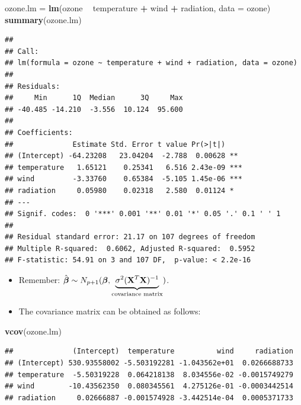 \documentclass[10pt,ignorenonframetext,]{beamer}
\newenvironment{Shaded}{\begin{snugshade}}{\end{snugshade}}
\newcommand{\KeywordTok}[1]{\textcolor[rgb]{0.13,0.29,0.53}{\textbf{#1}}}
\newcommand{\DataTypeTok}[1]{\textcolor[rgb]{0.13,0.29,0.53}{#1}}
\newcommand{\StringTok}[1]{\textcolor[rgb]{0.31,0.60,0.02}{#1}}
\newcommand{\OperatorTok}[1]{\textcolor[rgb]{0.81,0.36,0.00}{\textbf{#1}}}
\newcommand{\NormalTok}[1]{#1}
\begin{document}
\begin{frame}[fragile]

\scriptsize

\begin{Shaded}
\begin{Highlighting}[]
\NormalTok{ozone.lm =}\StringTok{ }\KeywordTok{lm}\NormalTok{(ozone }\OperatorTok{~}\StringTok{ }\NormalTok{temperature }\OperatorTok{+}\StringTok{ }\NormalTok{wind }\OperatorTok{+}\StringTok{ }\NormalTok{radiation, }\DataTypeTok{data =}\NormalTok{ ozone)}
\KeywordTok{summary}\NormalTok{(ozone.lm)}
\end{Highlighting}
\end{Shaded}

\begin{verbatim}
## 
## Call:
## lm(formula = ozone ~ temperature + wind + radiation, data = ozone)
## 
## Residuals:
##     Min      1Q  Median      3Q     Max 
## -40.485 -14.210  -3.556  10.124  95.600 
## 
## Coefficients:
##              Estimate Std. Error t value Pr(>|t|)    
## (Intercept) -64.23208   23.04204  -2.788  0.00628 ** 
## temperature   1.65121    0.25341   6.516 2.43e-09 ***
## wind         -3.33760    0.65384  -5.105 1.45e-06 ***
## radiation     0.05980    0.02318   2.580  0.01124 *  
## ---
## Signif. codes:  0 '***' 0.001 '**' 0.01 '*' 0.05 '.' 0.1 ' ' 1
## 
## Residual standard error: 21.17 on 107 degrees of freedom
## Multiple R-squared:  0.6062, Adjusted R-squared:  0.5952 
## F-statistic: 54.91 on 3 and 107 DF,  p-value: < 2.2e-16
\end{verbatim}

\end{frame}

\begin{frame}[fragile]

\begin{itemize}
\item
  Remember:
  \(\hat{\boldsymbol\beta}\sim N_{p+1}(\boldsymbol{\beta},\underbrace{\sigma^2({\bf X}^T{\bf X})^{-1}}_{\text{covariance matrix}})\).
\item
  The covariance matrix can be obtained as follows:
\end{itemize}

\scriptsize

\begin{Shaded}
\begin{Highlighting}[]
\KeywordTok{vcov}\NormalTok{(ozone.lm)}
\end{Highlighting}
\end{Shaded}

\begin{verbatim}
##              (Intercept)  temperature          wind     radiation
## (Intercept) 530.93558002 -5.503192281 -1.043562e+01  0.0266688733
## temperature  -5.50319228  0.064218138  8.034556e-02 -0.0015749279
## wind        -10.43562350  0.080345561  4.275126e-01 -0.0003442514
## radiation     0.02666887 -0.001574928 -3.442514e-04  0.0005371733
\end{verbatim}

\end{frame}
\end{document}
